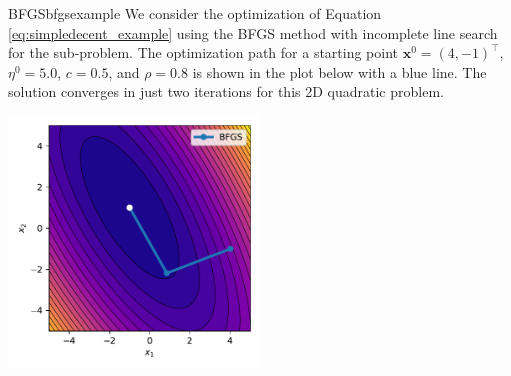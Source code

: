 \begin{example}{BFGS}{bfgsexample}
    We consider the optimization of Equation \eqref{eq:simpledecent_example} using the BFGS method with incomplete line search for the sub-problem. The optimization path for a starting point $\mathbf{x}^0= (4, -1)^\top$, $\eta^0=5.0$, $c=0.5$, and $\rho=0.8$ is shown in the plot below with a blue line. The solution converges in just two iterations for this 2D quadratic problem.
    \begin{center}
        \includegraphics[width=0.5\textwidth]{figures/bfgs.pdf}
    \end{center}   
\end{example}



 


